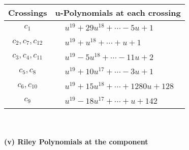 \documentclass[1p]{elsarticle_modified}
\theoremstyle{definition}
\begin{document}
\begin{tabular}{m{50pt}|m{274pt}}
Crossings & \hspace{64pt}u-Polynomials at each crossing \\
\hline $$\begin{aligned}c_{1}\end{aligned}$$&$\begin{aligned}
&u^{19}+29 u^{18}+\cdots-5 u+1
\end{aligned}$\\
\hline $$\begin{aligned}c_{2},c_{7},c_{12}\end{aligned}$$&$\begin{aligned}
&u^{19}+u^{18}+\cdots+u+1
\end{aligned}$\\
\hline $$\begin{aligned}c_{3},c_{4},c_{11}\end{aligned}$$&$\begin{aligned}
&u^{19}-5 u^{18}+\cdots-11 u+2
\end{aligned}$\\
\hline $$\begin{aligned}c_{5},c_{8}\end{aligned}$$&$\begin{aligned}
&u^{19}+10 u^{17}+\cdots-3 u+1
\end{aligned}$\\
\hline $$\begin{aligned}c_{6},c_{10}\end{aligned}$$&$\begin{aligned}
&u^{19}+15 u^{18}+\cdots+1280 u+128
\end{aligned}$\\
\hline $$\begin{aligned}c_{9}\end{aligned}$$&$\begin{aligned}
&u^{19}-18 u^{17}+\cdots+u+142
\end{aligned}$\\
\hline
\end{tabular}\\~\\
\newpage\renewcommand{\arraystretch}{1}
\flushleft \textbf{(v) Riley Polynomials at the component}\newline \\
\end{document}
